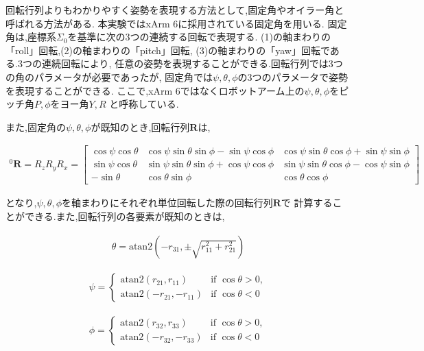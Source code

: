 回転行列よりもわかりやすく姿勢を表現する方法として,固定角やオイラー角と呼ばれる方法がある.
本実験ではxArm 6に採用されている固定角を用いる.
固定角は,座標系$\Sigma_0$を基準に次の3つの連続する回転で表現する.
(1)の軸まわりの「roll」回転,(2)の軸まわりの「pitch」回転,
(3)の軸まわりの「yaw」回転である.3つの連続回転により,
任意の姿勢を表現することができる.回転行列では3つの角のパラメータが必要であったが,
固定角では$\psi, \theta, \phi$の3つのパラメータで姿勢を表現することができる.
ここで,xArm 6ではなくロボットアーム上の$\psi, \theta, \phi$をピッチ角$P, \phi$をヨー角$Y, R$
と呼称している.

また,固定角の$\psi, \theta, \phi$が既知のとき,回転行列$\mathbf{R}$は,

\begin{align}
  ^0\mathbf{R} = R_z R_y R_x = 
  \begin{bmatrix} 
    \cos \psi \cos \theta & \cos \psi \sin \theta \sin \phi - \sin \psi \cos \phi & \cos \psi \sin \theta \cos \phi + \sin \psi \sin \phi \\ 
    \sin \psi \cos \theta & \sin \psi \sin \theta \sin \phi + \cos \psi \cos \phi & \sin \psi \sin \theta \cos \phi - \cos \psi \sin \phi \\ 
    - \sin \theta         & \cos \theta \sin \phi                                 & \cos \theta \cos \phi 
  \end{bmatrix} \tag{2.17}
\end{align}

となり,$\psi, \theta, \phi$を軸まわりにそれぞれ単位回転した際の回転行列$\mathbf{R}$で
計算することができる.また,回転行列の各要素が既知のときは,

\begin{align}
  \theta = \text{atan2} \left( -r_{31}, \pm \sqrt{r_{11}^2 + r_{21}^2} \right) \tag{2.18}
\end{align}

\begin{align}
  \psi = 
  \begin{cases}
    \text{atan2}(r_{21}, r_{11})   & \text{if } \cos \theta > 0, \\
    \text{atan2}(-r_{21}, -r_{11}) & \text{if } \cos \theta < 0
  \end{cases} \tag{2.19}
\end{align}

\begin{align}
  \phi = 
  \begin{cases}
    \text{atan2}(r_{32}, r_{33})   & \text{if } \cos \theta > 0, \\
    \text{atan2}(-r_{32}, -r_{33}) & \text{if } \cos \theta < 0
  \end{cases} \tag{2.20}
\end{align}

